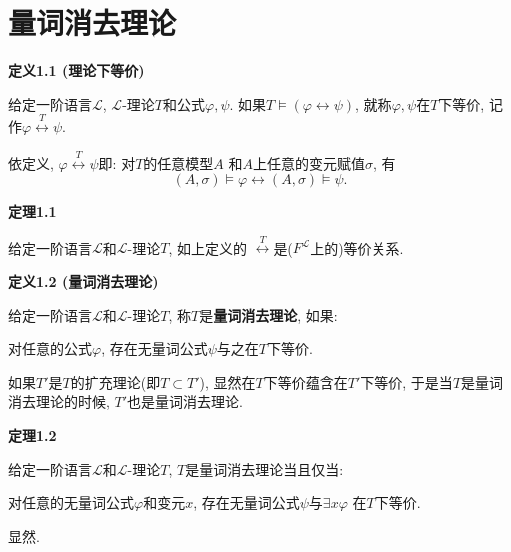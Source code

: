 \documentclass[UTF8]{ctexart}
\begin{document}
\setlength{\abovedisplayskip}{1pt}
\setlength{\belowdisplayskip}{1pt}

\section{量词消去理论}

\hypertarget{sec:定义1.1}{}
\noindent\textbf{定义1.1 (理论下等价)}

给定一阶语言$\mathcal{L}$, $\mathcal{L}$-理论$T$和公式$\varphi,\psi$.
如果$T\models(\varphi\leftrightarrow\psi)$, 就称$\varphi,\psi$在$T$下等价,
记作$\varphi\overset{T}{\leftrightarrow}\psi$.

\vspace{10pt}

依定义, $\varphi\overset{T}{\leftrightarrow}\psi$即: 对$T$的任意模型$A$
和$A$上任意的变元赋值$\sigma$, 有
\[
    (A,\sigma)\models\varphi\leftrightarrow(A,\sigma)\models\psi.
\]

\vspace{10pt}

\hypertarget{sec:定理1.1}{}
\noindent\textbf{定理1.1}

给定一阶语言$\mathcal{L}$和$\mathcal{L}$-理论$T$, 如上定义的
$\overset{T}{\leftrightarrow}$是($F^{\mathcal{L}}$上的)等价关系.

\vspace{10pt}

\hypertarget{sec:定义1.2}{}
\noindent\textbf{定义1.2 (量词消去理论)}

给定一阶语言$\mathcal{L}$和$\mathcal{L}$-理论$T$, 称$T$是\textbf{量词消去理论}, 如果:

对任意的公式$\varphi$, 存在无量词公式$\psi$与之在$T$下等价.

\vspace{10pt}

如果$T'$是$T$的扩充理论(即$T\subset T'$), 显然在$T$下等价蕴含在$T'$下等价,
于是当$T$是量词消去理论的时候, $T'$也是量词消去理论.

\vspace{10pt}

\hypertarget{sec:定理1.2}{}
\noindent\textbf{定理1.2}

给定一阶语言$\mathcal{L}$和$\mathcal{L}$-理论$T$, $T$是量词消去理论当且仅当:

对任意的无量词公式$\varphi$和变元$x$, 存在无量词公式$\psi$与$\exists x\varphi$
在$T$下等价.


 显然.
\end{document}
